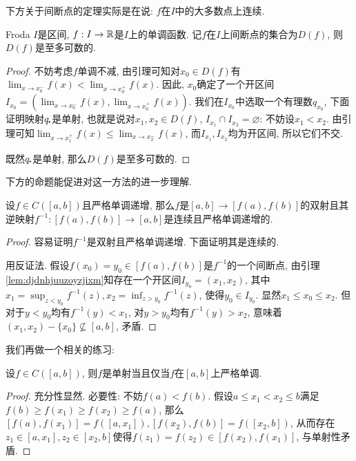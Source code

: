 下方关于间断点的定理实际是在说: $f$在$I$中的大多数点上连续. 

\begin{theorem}{Froda}
	$I$是区间, $f:I \to \mathbb{R}$是$I$上的单调函数. 记$f$在$I$上间断点的集合为$D(f)$, 则$D(f)$是至多可数的. 
\end{theorem}
\begin{proof}
	不妨考虑$f$单调不减, 由引理可知对$x_0 \in D(f)$有$\lim_{x \to x_0^-} f(x) < \lim_{x \to x_0^+} f(x)$. 因此, $x_0$确定了一个开区间$I_{x_0}=(\lim_{x \to x_0^-} f(x) , \lim_{x \to x_0^+} f(x))$. 我们在$I_{x_0}$中选取一个有理数$q_{x_0}$, 下面证明映射$q_{\bigcdot}$是单射, 也就是说对$x_1,x_2 \in D(f)$, $I_{x_1} \cap I_{x_2} = \varnothing$: 不妨设$x_1<x_2$. 由引理可知$\lim_{x \to x_1^+} f(x) \leq \lim_{x \to x_2^-} f(x)$, 而$I_{x_1},I_{x_2}$均为开区间, 所以它们不交. 
	
	既然$q_{\bigcdot}$是单射, 那么$D(f)$是至多可数的. 
\end{proof}

下方的命题能促进对这一方法的进一步理解. 

\begin{proposition}{}
	设$f \in C([a,b])$且严格单调递增, 那么$f$是$[a,b] \to [f(a),f(b)]$的双射且其逆映射$f^{-1}:[f(a),f(b)] \to [a,b]$是连续且严格单调递增的. 
\end{proposition}
\begin{proof}
	容易证明$f^{-1}$是双射且严格单调递增. 下面证明其是连续的. 
	
	用反证法. 假设$f(x_0)=y_0 \in [f(a),f(b)]$是$f^{-1}$的一个间断点, 由引理\ref{lem:djdnhjuuzoyzjixm}知存在一个开区间$I_{y_0}=(x_1,x_2)$, 其中$x_1=\sup_{z<y_0}f^{-1}(z),x_2=\inf_{z>y_0}f^{-1}(z)$, 使得$y_0 \in I_{y_0}$. 显然$x_1 \leq x_0 \leq x_2$. 但对于$y<y_0$均有$f^{-1}(y)<x_1$, 对$y>y_0$均有$f^{-1}(y)>x_2$, 意味着$(x_1,x_2)-\{ x_0 \} \nsubseteq [a,b]$, 矛盾. 
\end{proof}

我们再做一个相关的练习: 

\begin{proposition}{}
	设$f \in C([a,b])$, 则$f$是单射当且仅当$f$在$[a,b]$上严格单调. 
\end{proposition}
\begin{proof}
	充分性显然. 必要性: 不妨$f(a)<f(b)$. 假设$a \leq x_1 < x_2 \leq b$满足$f(b) \geq f(x_1) \geq f(x_2) \geq f(a)$, 那么$[f(a),f(x_1)] = f([a,x_1]), [f(x_2),f(b)] = f([x_2,b])$, 从而存在$z_1 \in [a,x_1],z_2 \in [x_2,b]$使得$f(z_1)=f(z_2) \in [f(x_2),f(x_1)]$, 与单射性矛盾. 
\end{proof}

